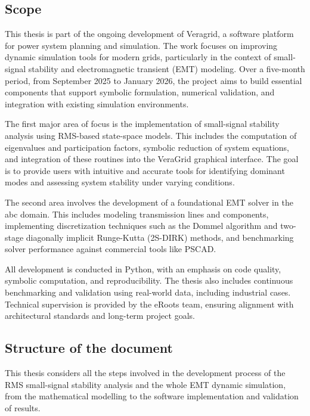 \subsection{Scope}

This thesis is part of the ongoing development of Veragrid, a software platform for power system planning and simulation. 
The work focuses on improving dynamic simulation tools for modern grids, particularly in the context of small-signal stability and electromagnetic transient (EMT) modeling.
Over a five-month period, from September 2025 to January 2026, the project aims to build essential components that support symbolic formulation, numerical validation,
and integration with existing simulation environments. 

The first major area of focus is the implementation of small-signal stability analysis using RMS-based state-space models.
This includes the computation of eigenvalues and participation factors, symbolic reduction of system equations,
and integration of these routines into the VeraGrid graphical interface.
The goal is to provide users with intuitive and accurate tools for identifying dominant modes and assessing system stability under varying conditions.

The second area involves the development of a foundational EMT solver in the abc domain. This includes modeling transmission lines and components,
implementing discretization techniques such as the Dommel algorithm and two-stage diagonally implicit Runge-Kutta (2S-DIRK) methods,
and benchmarking solver performance against commercial tools like PSCAD.

All development is conducted in Python, with an emphasis on code quality, symbolic computation, and reproducibility.
The thesis also includes continuous benchmarking and validation using real-world data, including industrial cases.
Technical supervision is provided by the eRoots team, ensuring alignment with architectural standards and long-term project goals.

\subsection{Structure of the document}

This thesis considers all the steps involved in the development process of the RMS small-signal stability analysis and the whole EMT
dynamic simulation, from the mathematical modelling to the software implementation and validation of results.

